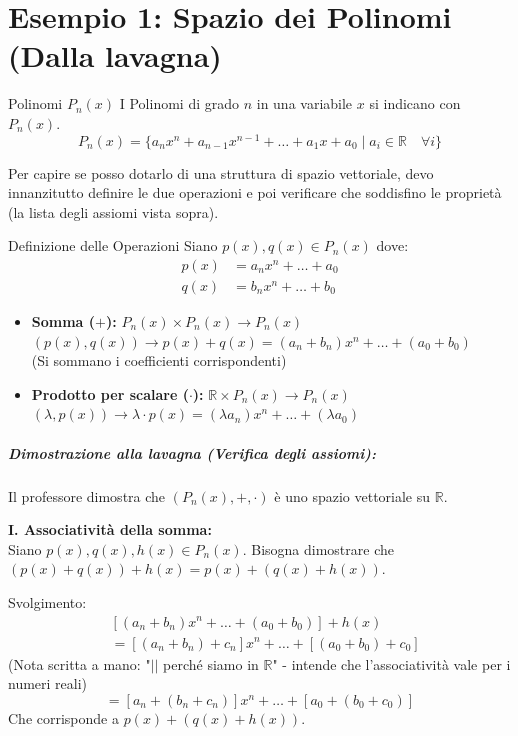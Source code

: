\section{Esempio 1: Spazio dei Polinomi (Dalla lavagna)}

\begin{definition}{Polinomi $P_n(x)$}{}
I Polinomi di grado $n$ in una variabile $x$ si indicano con $P_n(x)$.
\[
P_n(x) = \{ a_n x^n + a_{n-1} x^{n-1} + \dots + a_1 x + a_0 \mid a_i \in \mathbb{R} \quad \forall i \}
\]
\end{definition}

Per capire se posso dotarlo di una struttura di spazio vettoriale, devo innanzitutto definire le due operazioni e poi verificare che soddisfino le proprietà (la lista degli assiomi vista sopra).

\begin{proposition}{Definizione delle Operazioni}{}
Siano $p(x), q(x) \in P_n(x)$ dove:
\[
\begin{aligned}
p(x) &= a_n x^n + \dots + a_0 \\
q(x) &= b_n x^n + \dots + b_0
\end{aligned}
\]

\begin{itemize}
    \item \textbf{Somma ($+$):} $P_n(x) \times P_n(x) \to P_n(x)$ \\
    $(p(x), q(x)) \to p(x) + q(x) = (a_n + b_n)x^n + \dots + (a_0 + b_0)$ \\
    (Si sommano i coefficienti corrispondenti)
    
    \item \textbf{Prodotto per scalare ($\cdot$):} $\mathbb{R} \times P_n(x) \to P_n(x)$ \\
    $(\lambda, p(x)) \to \lambda \cdot p(x) = (\lambda a_n)x^n + \dots + (\lambda a_0)$
\end{itemize}
\end{proposition}

\subparagraph{Dimostrazione alla lavagna (Verifica degli assiomi):}
Il professore dimostra che $(P_n(x), +, \cdot)$ è uno spazio vettoriale su $\mathbb{R}$.

\textbf{I. Associatività della somma:}\\
Siano $p(x), q(x), h(x) \in P_n(x)$. Bisogna dimostrare che $(p(x)+q(x))+h(x) = p(x)+(q(x)+h(x))$.

Svolgimento:
\[
\begin{aligned}
&[(a_n+b_n)x^n + \dots + (a_0+b_0)] + h(x) \\
&= [(a_n+b_n) + c_n]x^n + \dots + [(a_0+b_0) + c_0]
\end{aligned}
\]
(Nota scritta a mano: "$||$ perché siamo in $\mathbb{R}$" - intende che l'associatività vale per i numeri reali)
\[
= [a_n + (b_n+c_n)]x^n + \dots + [a_0 + (b_0+c_0)]
\]
Che corrisponde a $p(x) + (q(x) + h(x))$.

